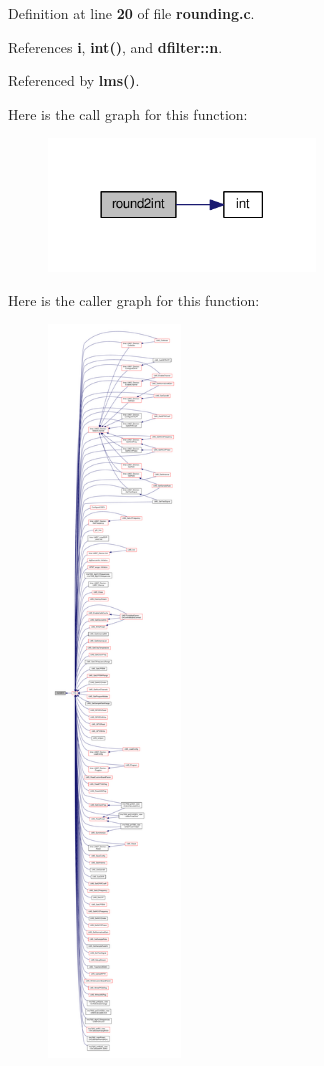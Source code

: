 Definition at line {\bf 20} of file {\bf rounding.\+c}.



References {\bf i}, {\bf int()}, and {\bf dfilter\+::n}.



Referenced by {\bf lms()}.



Here is the call graph for this function\+:
\nopagebreak
\begin{figure}[H]
\begin{center}
\leavevmode
\includegraphics[width=201pt]{d2/dbe/rounding_8h_aca2670cc0fbf948a6b9cb670047c9d5b_cgraph}
\end{center}
\end{figure}




Here is the caller graph for this function\+:
\nopagebreak
\begin{figure}[H]
\begin{center}
\leavevmode
\includegraphics[height=550pt]{d2/dbe/rounding_8h_aca2670cc0fbf948a6b9cb670047c9d5b_icgraph}
\end{center}
\end{figure}



